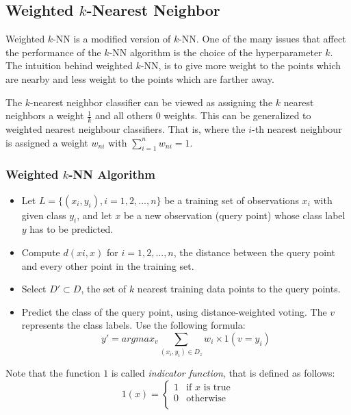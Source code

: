 \subsection{Weighted \(k\)-Nearest Neighbor}
Weighted \(k\)-NN is a modified version of \(k\)-NN. One of the many issues that affect the performance of the \(k\)-NN algorithm is the choice of the hyperparameter \(k\). The intuition behind weighted \(k\)-NN, is to give more weight to the points which are nearby and less weight to the points which are farther away.

The \(k\)-nearest neighbor classifier can be viewed as assigning the \(k\) nearest neighbors a weight \(\frac 1 k\) and all others \(0\) weights. This can be generalized to weighted nearest neighbour classifiers. That is, where the \(i\)-th nearest neighbour is assigned a weight \(w_{ni}\) with \(\sum_{i=1}^nw_{ni}=1\). 

\subsubsection{Weighted \(k\)-NN Algorithm}
\begin{itemize}
    \item
    Let \(L=\{(x_i,y_i), i=1,2,...,n\}\) be a training set of observations \(x_i\) with given class \(y_i\), and let \(x\) be a new observation (query point) whose class label \(y\) has to be predicted.
    \item
    Compute \(d(xi,x)\) for \(i=1,2,...,n\), the distance between the query point and every other point in the training set.
    \item
    Select \(D' \subset D\), the set of \(k\) nearest training data points to the query points.
    \item
    Predict the class of the query point, using distance-weighted voting. The \(v\) represents the class labels. Use the following formula:
    \begin{equation}
        y'=argmax_v \sum_{(x_i,y_i) \in D_z}w_i \times 1(v=y_i)
    \end{equation}
\end{itemize}
Note that the function \(1\) is called \emph{indicator function}, that is defined as follows:
\begin{equation}
    1(x) = 
    \begin{cases}
        1                    &\text{if } x \text{ is true}\\
        0                    &\text{otherwise}\\
    \end{cases}
\end{equation}

